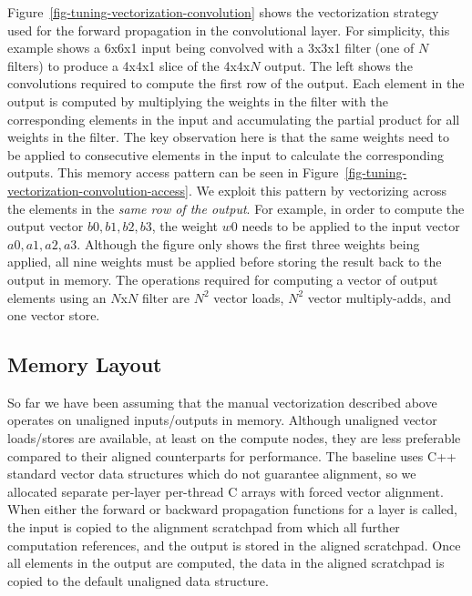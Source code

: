 Figure~\ref{fig-tuning-vectorization-convolution} shows the vectorization
strategy used for the forward propagation in the convolutional layer. For
simplicity, this example shows a 6x6x1 input being convolved with a 3x3x1
filter (one of $N$ filters) to produce a 4x4x1 slice of the 4x4x$N$
output. The left shows the convolutions required to compute the first row
of the output. Each element in the output is computed by multiplying the
weights in the filter with the corresponding elements in the input and
accumulating the partial product for all weights in the filter. The key
observation here is that the same weights need to be applied to
consecutive elements in the input to calculate the corresponding outputs.
This memory access pattern can be seen in
Figure~\ref{fig-tuning-vectorization-convolution-access}. We exploit this
pattern by vectorizing across the elements in the \emph{same row of the
  output}. For example,
in order to compute the output vector ${b0,b1,b2,b3}$, the weight $w0$
needs to be applied to the input vector ${a0,a1,a2,a3}$. Although the
figure only shows the first three weights being applied, all nine weights
must be applied before storing the result back to the output in
memory. The operations required for computing a vector of output elements
using an $N$x$N$ filter are $N^2$ vector loads, $N^2$ vector
multiply-adds, and one vector store.

\subsection{Memory Layout}
\label{sec-tuning-memory}

So far we have been assuming that the manual vectorization described
above operates on unaligned inputs/outputs in memory. Although unaligned
vector loads/stores are available, at least on the compute nodes, they
are less preferable compared to their aligned counterparts for
performance. The baseline uses C++ standard vector data structures which
do not guarantee alignment, so we allocated separate per-layer per-thread
C arrays with forced vector alignment. When either the forward or
backward propagation functions for a layer is called, the input is copied
to the alignment scratchpad from which all further computation
references, and the output is stored in the aligned scratchpad. Once all
elements in the output are computed, the data in the aligned scratchpad
is copied to the default unaligned data structure.

